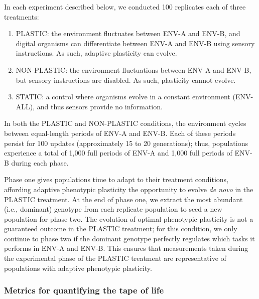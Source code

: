 % 

In each experiment described below, we conducted 100 replicates each of three treatments:
\begin{enumerate}
    \item PLASTIC: the environment fluctuates between ENV-A and ENV-B, and digital organisms can differentiate between ENV-A and ENV-B using sensory instructions. As such, adaptive plasticity can evolve.
    \item NON-PLASTIC: the environment fluctuations between ENV-A and ENV-B, but sensory instructions are disabled. As such, plasticity cannot evolve.
    \item STATIC: a control where organisms evolve in a constant environment (ENV-ALL), and thus sensors provide no information.
\end{enumerate}

In both the PLASTIC and NON-PLASTIC conditions, the environment cycles between equal-length periods of ENV-A and ENV-B.
Each of these periods persist for 100 updates (approximately 15 to 20 generations); thus, populations experience a total of 1,000 full periods of ENV-A and 1,000 full periods of ENV-B during each phase.

Phase one gives populations time to adapt to their treatment conditions, affording adaptive phenotypic plasticity the opportunity to evolve \textit{de novo} in the PLASTIC treatment.
At the end of phase one, we extract the most abundant (i.e., dominant) genotype from each replicate population to seed a new population for phase two.
The evolution of optimal phenotypic plasticity is not a guaranteed outcome in the PLASTIC treatment; for this condition, we only continue to phase two if the dominant genotype perfectly regulates which tasks it performs in ENV-A and ENV-B.
This ensures that measurements taken during the experimental phase of the PLASTIC treatment are representative of populations with adaptive phenotypic plasticity.

\vspace{1cm}
\subsubsection{Metrics for quantifying the tape of life}
\label{sec:methods:measurements}

